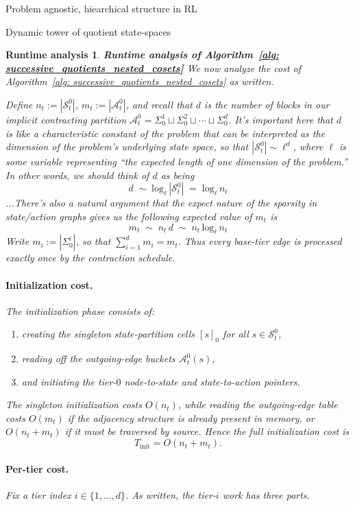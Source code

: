 \documentclass[11pt]{article}
\newtheorem{run_analysis}[subsubsection]{Runtime analysis}
\begin{document}
\begin{section}{Problem agnostic, hiearchical structure in RL}
\begin{subsection}{Dynamic tower of quotient state-spaces}
\begin{run_analysis}
{\bf Runtime analysis of Algorithm~\ref{alg: successive_quotients_nested_cosets}}
\normalfont
We now analyze the cost of Algorithm~\ref{alg: successive_quotients_nested_cosets} as written.

Define
$
n_t:=|\mathcal{S}_t^0|$,
$
m_t:=|\mathcal{A}_t^0|$, and recall that $d$ is the number of blocks in our implicit contracting partition
$\mathcal{A}_t^0
=
\Sigma_0^1 \sqcup \Sigma_0^2 \sqcup \cdots \sqcup \Sigma_0^d
$.
It's important here that $d$ is like a characteristic constant of the problem that can be interpreted as the dimension of the problem's underlying state space, so that $|\mathcal{S}_t^0|\sim \ell^{d}$, where $\ell$ is some variable representing ``the expected length of one dimension of the problem.'' In other words, we should think of $d$ as being
\begin{equation}\label{eq: approx log}
d\;\sim\;\text{log}_{\ell}\,|\mathcal{S}_t^0|\;=\;\text{log}_{\ell}\,n_{t}
\end{equation}
...There's also a natural argument that the expect nature of the sparsity in state/action graphs gives us the following expected value of $m_{t}$ is
$$
m_{t}
\;\sim\;
n_{t}\,d
\;\sim\;
n_{t}\,\text{log}_{\ell}\,n_{t}
$$
Write
$
m_i:=|\Sigma_0^i|$, so that $\sum_{i=1}^d m_i=m_t.
$
Thus every base-tier edge is processed exactly once by the contraction schedule.

\paragraph{Initialization cost.}
The initialization phase consists of:
\begin{enumerate}
    \item creating the singleton state-partition cells $[s]_0$ for all $s\in\mathcal{S}_t^0$,
    \item reading off the outgoing-edge buckets $\mathcal{A}_t^0(s)$,
    \item and initiating the tier-$0$ node-to-state and state-to-action pointers.
\end{enumerate}
The singleton initialization costs $O(n_t)$, while reading the outgoing-edge table costs $O(m_t)$ if the adjacency structure is already present in memory, or $O(n_t+m_t)$ if it must be traversed by source. Hence the full initialization cost is
\[
T_{\mathrm{init}}=O(n_t+m_t).
\]

\paragraph{Per-tier cost.}
Fix a tier index $i\in\{1,\dots,d\}$. As written, the tier-$i$ work has three parts.


\end{run_analysis}
\end{subsection}
\end{section}
\end{document}
